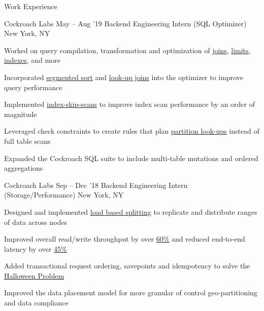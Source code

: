 \documentclass{resume} %
\begin{document}
\begin{rSection}{Work Experience}
  \begin{rSubsection}{Cockroach Labs}
    {May -- Aug '19}
         {Backend Engineering Intern (SQL Optimizer)}
         {New York, NY}
       \item Worked on query compilation, transformation and
         optimization of
         \setul{4pt}{.4pt}
         \href{https://github.com/cockroachdb/cockroach/pull/38285}{\ul{joins}},
         \href{https://github.com/cockroachdb/cockroach/pull/38660}{\ul{limits}}, 
         \href{https://github.com/cockroachdb/cockroach/pull/37616}{\ul{indexes}}, 
         and more
       \item Incorporated 
         \href{https://github.com/cockroachdb/cockroach/pull/38452}{\underline{segmented
             sort}}
         and 
         \href{https://github.com/cockroachdb/cockroach/pull/38285}{\underline{look-up
             joins}} into the optimizer
         to improve query performance
       \item Implemented
         \href{https://github.com/cockroachdb/cockroach/pull/39668}{\ul{index-skip-scans}}
         to improve index scan performance by an order of magnitude
       \item Leveraged check constraints to create rules that plan
         \href{https://github.com/cockroachdb/cockroach/pull/38963}{\underline{partition look-ups}}
         instead of full table scans
       \item Expanded the Cockroach SQL suite to include multi-table mutations
         and ordered aggregations
  \end{rSubsection}

  \begin{rSubsection}{Cockroach Labs}
    {Sep -- Dec '18}
         {Backend Engineering Intern (Storage/Performance)}
         {New York, NY}
       \item Designed and implemented \href{https://github.com/cockroachdb/cockroach/pull/31413}
      {\underline{load based splitting}} to replicate
      and distribute ranges of data across nodes
    \item Improved overall read/write throughput by over
         \setul{4pt}{.4pt}
         \href{https://github.com/cockroachdb/cockroach/issues/31819}{\ul{60\%}}
         and reduced end-to-end latency by over
         \href{https://github.com/cockroachdb/cockroach/issues/31819}{\ul{45\%}}
       \item Added transactional request
           ordering, savepoints and idempotency to solve the 
         \setul{4pt}{.4pt}
         \href{https://github.com/cockroachdb/cockroach/pull/33244}{\ul{Halloween
             Problem}}
       \item Improved the data placement
         model for more granular of control geo-partitioning and data compliance
  \end{rSubsection}


\end{rSection}
\end{document}
